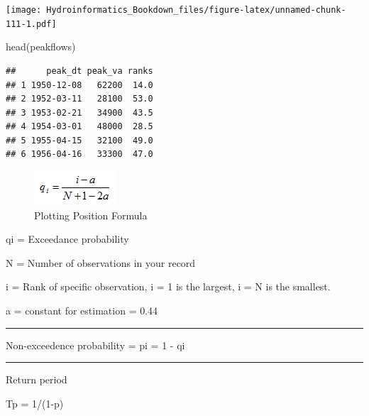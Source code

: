 \documentclass[
]{book}
\newenvironment{Shaded}{\begin{snugshade}}{\end{snugshade}}
\newcommand{\FunctionTok}[1]{\textcolor[rgb]{0.00,0.00,0.00}{#1}}
\newcommand{\NormalTok}[1]{#1}
\begin{document}
\texttt{[image: Hydroinformatics\_Bookdown\_files/figure-latex/unnamed-chunk-111-1.pdf]}

\begin{Shaded}
\begin{Highlighting}[]
\FunctionTok{head}\NormalTok{(peakflows)}
\end{Highlighting}
\end{Shaded}

\begin{verbatim}
##      peak_dt peak_va ranks
## 1 1950-12-08   62200  14.0
## 2 1952-03-11   28100  53.0
## 3 1953-02-21   34900  43.5
## 4 1954-03-01   48000  28.5
## 5 1955-04-15   32100  49.0
## 6 1956-04-16   33300  47.0
\end{verbatim}

\begin{figure}
\centering
\includegraphics{images/plottingposition.png}
\caption{Plotting Position Formula}
\end{figure}

qi = Exceedance probability

N = Number of observations in your record

i = Rank of specific observation, i = 1 is the largest, i = N is the smallest.

a = constant for estimation = 0.44

\begin{center}\rule{0.5\linewidth}{0.5pt}\end{center}

Non-exceedence probability = pi = 1 - qi

\begin{center}\rule{0.5\linewidth}{0.5pt}\end{center}

Return period

Tp = 1/(1-p)
\end{document}
